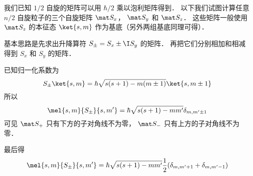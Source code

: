 

我们已知 $1/2$ 自旋的矩阵可以用 $\hbar/2$ 乘以泡利矩阵得到． 以下我们试图计算任意 $n/2$ 自旋粒子的三个自旋矩阵 $\mat S_x$， $\mat S_y$ 和 $\mat S_z$． 这些矩阵一般使用 $\mat S_z$ 的本征态 $\ket{s, m}$ 作为基底（另外两组基底同理可得）．

基本思路是先求出升降算符 $S_\pm = S_x \pm \I S_y$ 的矩阵． 再把它们分别相加和相减得到 $S_x$ 和 $S_y$ 的矩阵．

已知归一化系数为
\begin{equation}
S_\pm \ket{s,m} = \hbar \sqrt{s(s + 1) - m(m \pm 1)} \ket{s,m\pm1}
\end{equation}
所以
\begin{equation}
\mel{s,m}{S_\pm}{s,m'} = \hbar \sqrt{s(s + 1) - mm'} \delta_{m, m'\pm1}
\end{equation}
可见 $\mat S_+$ 只有下方的子对角线不为零， $\mat S_-$ 只有上方的子对角线不为零．

最后得
\begin{equation}
\mel{s,m}{S_\pm}{s,m'} = \hbar \sqrt{s(s + 1) - mm'} \frac12(\delta_{m, m'+1} + \delta_{m, m'-1})
\end{equation}
